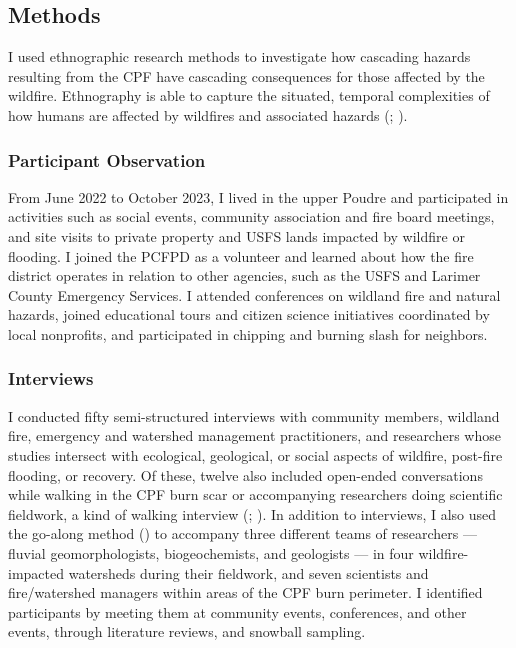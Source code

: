 \documentclass[
]{article}
\begin{document}
\subsection{Methods}\label{methods-2}

I used ethnographic research methods to investigate how cascading hazards resulting from the CPF have cascading consequences for those affected by the wildfire. Ethnography is able to capture the situated, temporal complexities of how humans are affected by wildfires and associated hazards (; ).

\subsubsection{Participant Observation}\label{participant-observation-2}

From June 2022 to October 2023, I lived in the upper Poudre and participated in activities such as social events, community association and fire board meetings, and site visits to private property and USFS lands impacted by wildfire or flooding. I joined the PCFPD as a volunteer and learned about how the fire district operates in relation to other agencies, such as the USFS and Larimer County Emergency Services. I attended conferences on wildland fire and natural hazards, joined educational tours and citizen science initiatives coordinated by local nonprofits, and participated in chipping and burning slash for neighbors.

\subsubsection{Interviews}\label{interviews-2}

I conducted fifty semi-structured interviews with community members, wildland fire, emergency and watershed management practitioners, and researchers whose studies intersect with ecological, geological, or social aspects of wildfire, post-fire flooding, or recovery. Of these, twelve also included open-ended conversations while walking in the CPF burn scar or accompanying researchers doing scientific fieldwork, a kind of walking interview (; ). In addition to interviews, I also used the go-along method () to accompany three different teams of researchers --- fluvial geomorphologists, biogeochemists, and geologists --- in four wildfire-impacted watersheds during their fieldwork, and seven scientists and fire/watershed managers within areas of the CPF burn perimeter. I identified participants by meeting them at community events, conferences, and other events, through literature reviews, and snowball sampling.
\end{document}
